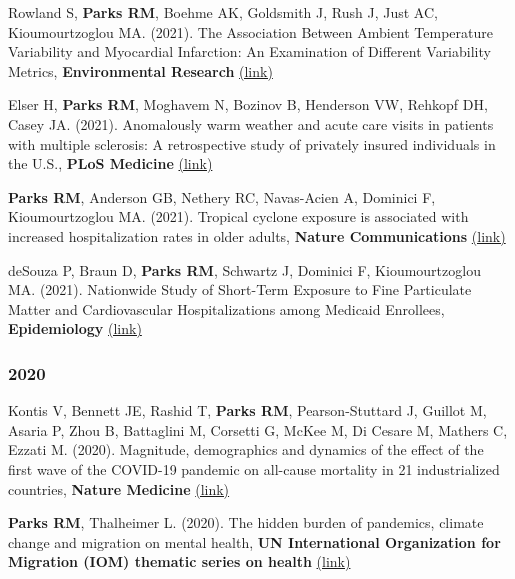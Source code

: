 \noindent Rowland S, \textbf{Parks RM}, Boehme AK, Goldsmith J, Rush J, Just AC, Kioumourtzoglou MA. (2021). The Association Between Ambient Temperature Variability and Myocardial Infarction: An Examination of Different Variability Metrics, \textbf{Environmental Research} \href{https://www.sciencedirect.com/science/article/pii/S0013935121005016}{(link)} \smallskip

\noindent Elser H, \textbf{Parks RM}, Moghavem N, Bozinov B, Henderson VW, Rehkopf DH, Casey JA. (2021). Anomalously warm weather and acute care visits in patients with multiple sclerosis: A retrospective study of privately insured individuals in the U.S., \textbf{PLoS Medicine} \href{https://journals.plos.org/plosmedicine/article?id=10.1371/journal.pmed.1003580}{(link)} \smallskip

\noindent \textbf{Parks RM}, Anderson GB, Nethery RC, Navas-Acien A, Dominici F, Kioumourtzoglou MA. (2021). Tropical cyclone exposure is associated with increased hospitalization rates in older adults, \textbf{Nature Communications} \href{https://www.nature.com/articles/s41467-021-21777-1}{(link)} \smallskip

\noindent deSouza P, Braun D, \textbf{Parks RM}, Schwartz J, Dominici F, Kioumourtzoglou MA. (2021). Nationwide Study of Short-Term Exposure to Fine Particulate Matter and Cardiovascular Hospitalizations among Medicaid Enrollees, \textbf{Epidemiology} \href{https://journals.lww.com/epidem/Abstract/2021/01000/Nationwide_Study_of_Short_term_Exposure_to_Fine.2.aspx}{(link)}

\subsubsection*{2020}

\noindent Kontis V, Bennett JE, Rashid T, \textbf{Parks RM}, Pearson-Stuttard J, Guillot M, Asaria P, Zhou B, Battaglini M, Corsetti G, McKee M, Di Cesare M, Mathers C, Ezzati M. (2020). Magnitude, demographics and dynamics of the effect of the first wave of the COVID-19 pandemic on all-cause mortality in 21 industrialized countries, \textbf{Nature Medicine} \href{https://doi.org/10.1038/s41591-020-1112-0}{(link)} \smallskip

\noindent \textbf{Parks RM}, Thalheimer L. (2020). The hidden burden of pandemics, climate change and migration on mental health, \textbf{UN International Organization for Migration (IOM) thematic series on health} \href{https://environmentalmigration.iom.int/blogs/hidden-burden-pandemics-climate-change-and-migration-mental-health}{(link)} \smallskip

